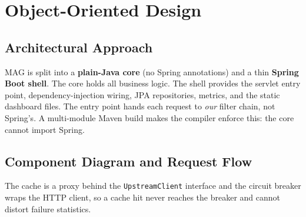 \documentclass[12pt,a4paper]{article}
\newcommand{\cls}[1]{\nolinkurl{#1}}
\begin{document}
\section{Object-Oriented Design}
\label{sec:ood}

\subsection{Architectural Approach}
MAG is split into a \textbf{plain-Java core} (no Spring annotations) and a thin \textbf{Spring Boot shell}. The core holds all business logic. The shell provides the servlet entry point, dependency-injection wiring, JPA repositories, metrics, and the static dashboard files. The entry point hands each request to \emph{our} filter chain, not Spring's. A multi-module Maven build makes the compiler enforce this: the core cannot import Spring.

\subsection{Component Diagram and Request Flow}
The cache is a proxy behind the \cls{UpstreamClient} interface and the circuit breaker wraps the HTTP client, so a cache hit never reaches the breaker and cannot distort failure statistics.
\end{document}
